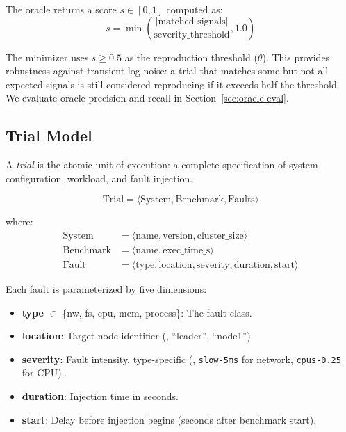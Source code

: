  The oracle returns a score $s \in [0, 1]$ computed as:
\begin{equation}
s = \min\left(\frac{|\text{matched signals}|}{\text{severity\_threshold}}, 1.0\right)
\end{equation}

The minimizer uses $s \geq 0.5$ as the reproduction threshold ($\theta$). This
provides robustness against transient log noise: a trial that matches some but
not all expected signals is still considered reproducing if it exceeds half the
threshold. We evaluate oracle precision and recall in Section~\ref{sec:oracle-eval}.

\subsection{Trial Model}
\label{sec:trial-model}

A \emph{trial} is the atomic unit of execution: a complete specification of
system configuration, workload, and fault injection.

\begin{equation}
\text{Trial} = \langle \text{System}, \text{Benchmark}, \text{Faults} \rangle
\end{equation}

\noindent where:
\begin{align}
\text{System} &= \langle \text{name}, \text{version}, \text{cluster\_size} \rangle \\
\text{Benchmark} &= \langle \text{name}, \text{exec\_time\_s} \rangle \\
\text{Fault} &= \langle \text{type}, \text{location}, \text{severity}, \text{duration}, \text{start} \rangle
\end{align}

Each fault is parameterized by five dimensions:
\begin{itemize}[leftmargin=*,topsep=2pt,itemsep=1pt]
  \item \textbf{type} $\in$ \{nw, fs, cpu, mem, process\}: The fault class.
  \item \textbf{location}: Target node identifier (\eg{}, ``leader'', ``node1'').
  \item \textbf{severity}: Fault intensity, type-specific (\eg{},
        \texttt{slow-5ms} for network, \texttt{cpus-0.25} for CPU).
  \item \textbf{duration}: Injection time in seconds.
  \item \textbf{start}: Delay before injection begins (seconds after benchmark start).
\end{itemize}

